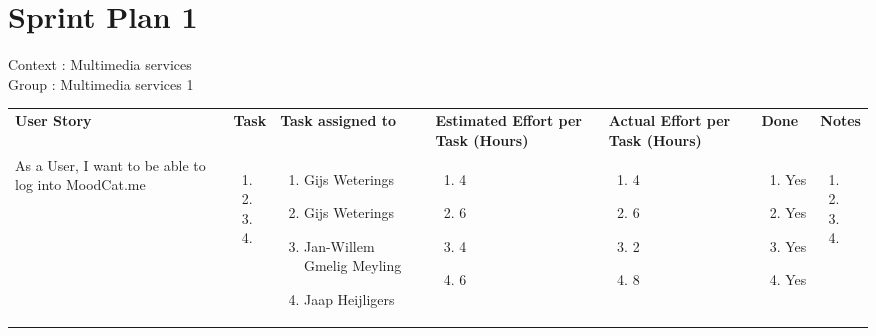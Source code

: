 \documentclass[11pt,a4paper]{article}
\begin{document}
\section*{Sprint Plan 1}
Context : Multimedia services\\
Group : Multimedia services 1\\



\begin{table}[h]
\begin{tabular}{|p{4cm}|p{0.6cm}|p{2.0cm}|p{1.8cm}|p{1.8cm}|p{1.0cm}|p{5cm}}
\textbf{User Story} & \textbf{Task} & \textbf{Task assigned to} & \textbf{Estimated Effort per Task (Hours)} & \textbf{Actual Effort per Task (Hours)} & \textbf{Done} & \textbf{Notes}\\
As a User, I want to be able to log into MoodCat.me & \begin{enumerate}[leftmargin=*,itemindent=0.1cm]
\item 
\item
\item 
\item 
\end{enumerate}

& 
\begin{enumerate}[leftmargin=*,itemindent=0.1cm]
\item[] Gijs Weterings
\item[] Gijs Weterings
\item[] Jan-Willem Gmelig Meyling
\item[] Jaap Heijligers 
\end{enumerate}

& 
\begin{enumerate}[leftmargin=*,itemindent=0.1cm]
\item[] 4 
\item[] 6 
\item[] 4 
\item[] 6 
\end{enumerate}
&
\begin{enumerate}[leftmargin=*,itemindent=0.1cm]
\item[] 4 
\item[] 6 
\item[] 2 
\item[] 8 
\end{enumerate}
&
\begin{enumerate}[leftmargin=*,itemindent=0.1cm]
\item[] Yes
\item[] Yes
\item[] Yes
\item[] Yes
\end{enumerate}
&
\begin{enumerate}[leftmargin=*,itemindent=0.1cm]
\item[]
\item[]
\item[]
\item[]
\end{enumerate}
 \\



\end{tabular}
\end{table}
\end{document}
